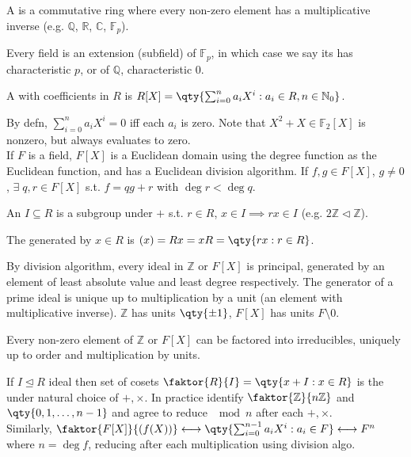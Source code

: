 \begin{definition}[Field]
    A  is a commutative ring where every non-zero element has a multiplicative inverse (e.g. $\mathbb{Q}$, $\mathbb{R}$, $\mathbb{C}$, $\mathbb{F}_p$).
\end{definition}

Every field is an extension (subfield) of $\mathbb{F}_p$, in which case we say its has characteristic $p$, or of $\mathbb{Q}$, characteristic 0.

\begin{definition}
    A  with coefficients in $R$ is $R[X] = \qty{\sum_{i=0}^{n} a_i X^i : a_i \in R, n \in \mathbb{N}_0}$.
\end{definition}

By defn, $\sum_{i=0}^n a_i X^i = 0$ iff each $a_i$ is zero.
Note that $X^2 + X \in \mathbb F_2[X]$ is nonzero, but always evaluates to zero. \\
If $F$ is a field, $F[X]$ is a Euclidean domain using the degree function as the Euclidean function, and has a Euclidean division algorithm.
If $f, g \in F[X]$, $g \neq 0$, $\exists \; q, r \in F[X]$ s.t. $f = qg + r$ with $\deg r < \deg q$.

\begin{definition}[Ideal]
    An  $I \subseteq R$ is a subgroup under $+$ s.t. $r \in R$, $x \in I \implies rx \in I$ (e.g. $2 \mathbb{Z} \triangleleft \mathbb{Z}$).
\end{definition}

\begin{definition}
    The  generated by $x \in R$ is $(x) = Rx = xR = \qty{rx : r \in R}$.
\end{definition}

By division algorithm, every ideal in $\mathbb{Z}$ or $F[X]$ is principal, generated by an element of least absolute value and least degree respectively.
The generator of a prime ideal is unique up to multiplication by a unit (an element with multiplicative inverse).
$\mathbb{Z}$ has units $\qty{\pm 1}$, $F[X]$ has units $F \setminus \qty{0}$.

Every non-zero element of $\mathbb{Z}$ or $F[X]$ can be factored into irreducibles, uniquely up to order and multiplication by units.

If $I \trianglelefteq R$ ideal then set of cosets $\faktor{R}{I} = \qty{x + I : x \in R}$ is the  under natural choice of $+, \times$.
In practice identify $\faktor{\mathbb{Z}}{n \mathbb{Z}}$ and $\qty{0, 1, \dots, n-1}$ and agree to reduce $\mod n$ after each $+, \times$. \\
Similarly, $\faktor{F[X]}{(f(X))} \longleftrightarrow \qty{\sum_{i=0}^{n-1} a_i X^i : a_i \in F} \longleftrightarrow F^n$ where $n = \deg f$, reducing after each multiplication using division algo.

